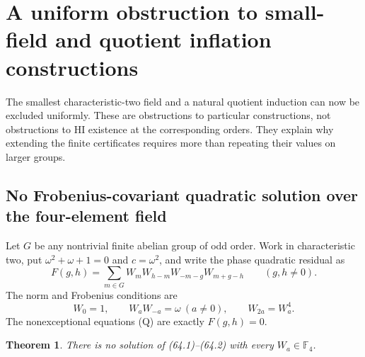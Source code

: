 \documentclass[11pt,reqno]{amsart}
\theoremstyle{plain}
\newtheorem{theorem}{Theorem}[section]
\begin{document}
\section{A uniform obstruction to small-field and quotient inflation constructions}\label{sec:64}

The smallest characteristic-two field and a natural quotient induction
can now be excluded uniformly. These are obstructions to particular
constructions, not obstructions to HI existence at the corresponding
orders. They explain why extending the finite certificates requires
more than repeating their values on larger groups.

\subsection{No Frobenius-covariant quadratic solution over the four-element field}\label{sec:64.1}

Let \(G\) be any nontrivial finite abelian group of odd order. Work
in characteristic two, put \(\omega^2+\omega+1=0\) and
\(c=\omega^2\), and write the phase quadratic residual as
\begin{equation*}
 F(g,h)=\sum_{m\in G}
 W_mW_{h-m}W_{-m-g}W_{m+g-h}\qquad(g,h\ne0).
 \tag{64.1}
\end{equation*}
The norm and Frobenius conditions are
\begin{equation*}
 W_0=1,\qquad W_aW_{-a}=\omega\ (a\ne0),
 \qquad W_{2a}=W_a^4.
 \tag{64.2}
\end{equation*}
The nonexceptional equations (Q) are exactly \(F(g,h)=0\).

\begin{theorem}
There is no solution of (64.1)--(64.2) with every
\(W_a\in\mathbb F_4\).
\end{theorem}
\end{document}
